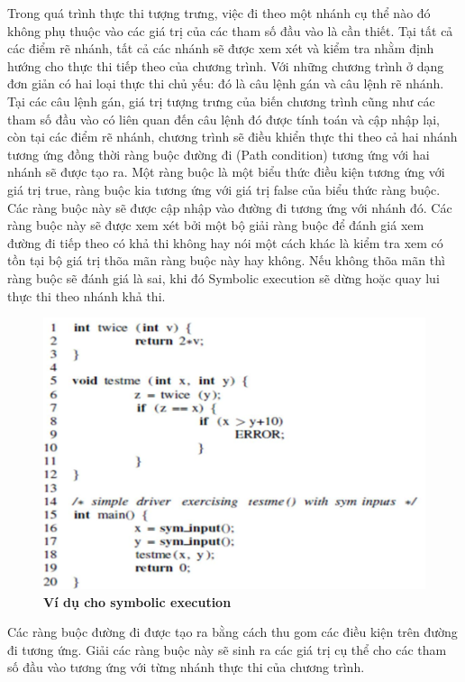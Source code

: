 \documentclass[12pt,a4paper]{report}
\begin{document}
\indent Trong quá trình thực thi tượng trưng, việc đi theo một nhánh cụ thể nào đó không phụ thuộc vào các giá trị của các tham số đầu vào là cần thiết. Tại tất cả các điểm rẽ nhánh, tất cả các nhánh sẽ được xem xét và kiểm tra nhằm định hướng cho thực thi tiếp theo của chương trình. Với những chương trình ở dạng đơn giản có hai loại thực thi chủ yếu: đó là câu lệnh gán và câu lệnh rẽ nhánh. Tại các câu lệnh gán, giá trị tượng trưng của biến chương trình cũng như các tham số đầu vào có liên quan đến câu lệnh đó được tính toán và cập nhập lại, còn tại các điểm rẽ nhánh, chương trình sẽ điều khiển thực thi theo cả hai nhánh tương ứng đồng thời ràng buộc đường đi (Path condition) tương ứng với hai nhánh sẽ được tạo ra. Một ràng buộc là một biểu thức điều kiện tương ứng với giá trị true, ràng buộc kia tương ứng với giá trị false của biểu thức ràng buộc. Các ràng buộc này sẽ được cập nhập vào đường đi tương ứng với nhánh đó. Các ràng buộc này sẽ được xem xét bởi một bộ giải ràng buộc để đánh giá xem đường đi tiếp theo có khả thi không hay nói một cách khác là kiểm tra xem có tồn tại bộ giá trị thõa mãn ràng buộc này hay không. Nếu không thõa mãn thì ràng buộc sẽ đánh giá là sai, khi đó Symbolic execution sẽ dừng hoặc quay lui thực thi theo nhánh khả thi.

\begin{figure}[ht]
\begin{center}
\includegraphics[scale=0.7]{hinhanh/hinh1}
\end{center}
\caption{\textbf{Ví dụ cho symbolic execution}}
\label{refhinh1}
\end{figure}

\indent Các ràng buộc đường đi được tạo ra bằng cách thu gom các điều kiện trên đường đi tương ứng. Giải các ràng buộc này sẽ sinh ra các giá trị cụ thể cho các tham số đầu vào tương ứng với từng nhánh thực thi của chương trình.
\end{document}
